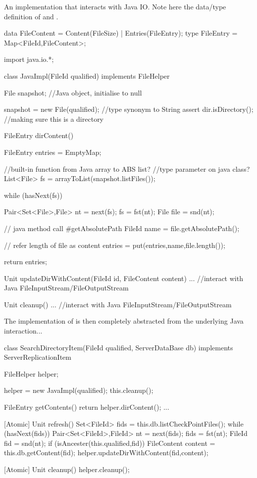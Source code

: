 \documentclass[a4paper,11pt,final]{article}
\begin{document}
\noindent An implementation that interacts with Java IO. Note here
the data/type definition of  and . 
\begin{absexamplen}
data FileContent = Content(FileSize) | Entries(FileEntry); 
type FileEntry = Map<FileId,FileContent>;
\end{absexamplen}

\begin{absexamplen}
import java.io.*;

class JavaImpl(FileId qualified) implements FileHelper {
  File snapshot; //Java object, initialise to null
  
  {
    snapshot = new File(qualified); //type synonym to String 
    assert dir.isDirectory(); //making sure this is a directory
  }

  FileEntry dirContent() {
    FileEntry entries = EmptyMap;
    
    //built-in function from Java array to ABS list?
    //type parameter on java class?
    List<File> fs = arrayToList(snapshot.listFiles());  
    
    while (hasNext(fs)) {
      Pair<Set<File>,File> nt = next(fs);
      fs = fst(nt);
      File file = snd(nt);
      
      // java method call #getAbsolutePath
      FileId name = file.getAbsolutePath();
      
      // refer length of file as content 
      entries = put(entries,name,file.length());
    }
    
    return entries;
  }
   
  Unit updateDirWithContent(FileId id, FileContent content) {
    ... //interact with Java FileInputStream/FileOutputStream
  }
                
  Unit cleanup() {
    ... //interact with Java FileInputStream/FileOutputStream 
  }
}
\end{absexamplen}

\noindent The implementation of  is then completely
abstracted from the underlying Java interaction...
\begin{absexamplen}
class SearchDirectoryItem(FileId qualified, ServerDataBase db) 
implements ServerReplicationItem {
  FileHelper helper;

  { 
    helper = new JavaImpl(qualified);
    this.cleanup(); 
  }  
	
  FileEntry getContents() { return helper.dirContent(); }
  ...
	
  [Atomic] Unit refresh() {
    Set<FileId> fids = this.db.listCheckPointFiles();
    while (hasNext(fids)) {
      Pair<Set<FileId>,FileId> nt = next(fids);
      fids = fst(nt);
      FileId fid = snd(nt);
      if (isAncester(this.qualified,fid)) {
        FileContent content = this.db.getContent(fid);
        helper.updateDirWithContent(fid,content);
      }
    }
  }
	
  [Atomic] Unit cleanup() { helper.cleanup(); }
}
\end{absexamplen}
\end{document}
